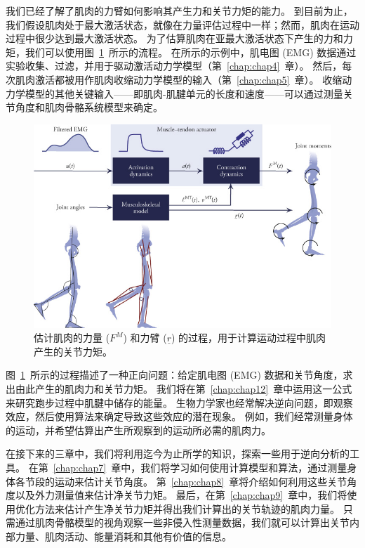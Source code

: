 我们已经了解了肌肉的力臂如何影响其产生力和关节力矩的能力。
到目前为止，我们假设肌肉处于最大激活状态，就像在力量评估过程中一样；然而，肌肉在运动过程中很少达到最大激活状态。
为了估算肌肉在亚最大激活状态下产生的力和力矩，我们可以使用图~\ref{fig:6_17}~所示的流程。
在所示的示例中，肌电图 (EMG) 数据通过实验收集、过滤，并用于驱动激活动力学模型（第~\ref{chap:chap4}~章）。
然后，每次肌肉激活都被用作肌肉收缩动力学模型的输入（第~\ref{chap:chap5}~章）。
收缩动力学模型的其他关键输入——即肌肉-肌腱单元的长度和速度——可以通过测量关节角度和肌肉骨骼系统模型来确定。


\begin{figure}[!htb]
	\centering
	\includegraphics[width=1.0\linewidth]{chap6/6_17}
	\caption{估计肌肉的力量 ($F^M$) 和力臂 ($\underline{r}$) 的过程，用于计算运动过程中肌肉产生的关节力矩。 \label{fig:6_17}}
\end{figure}


图~\ref{fig:6_17}~所示的过程描述了一种正向问题：给定肌电图 (EMG) 数据和关节角度，求出由此产生的肌肉力和关节力矩。
我们将在第~\ref{chap:chap12}~章中运用这一公式来研究跑步过程中肌腱中储存的能量。
生物力学家也经常解决逆向问题，即观察效应，然后使用算法来确定导致这些效应的潜在现象。
例如，我们经常测量身体的运动，并希望估算出产生所观察到的运动所必需的肌肉力。


在接下来的三章中，我们将利用迄今为止所学的知识，探索一些用于逆向分析的工具。
在第~\ref{chap:chap7}~章中，我们将学习如何使用计算模型和算法，通过测量身体各节段的运动来估计关节角度。
第~\ref{chap:chap8}~章将介绍如何利用这些关节角度以及外力测量值来估计净关节力矩。
最后，在第~\ref{chap:chap9}~章中，我们将使用优化方法来估计产生净关节力矩并得出我们计算出的关节轨迹的肌肉力量。
只需通过肌肉骨骼模型的视角观察一些非侵入性测量数据，我们就可以计算出关节内部力量、肌肉活动、能量消耗和其他有价值的信息。



